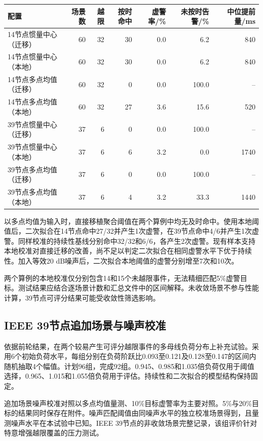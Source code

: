 \documentclass[UTF8,a4paper,11pt]{ctexart}
\begin{document}
\begin{center}
\small\setlength{\tabcolsep}{5pt}
\begin{tabular}{lrrrrrr}
\toprule
配置 & 场景数 & 越限 & 按时命中 & 虚警率/\% & 未按时告警/\% & 中位提前量/ms\\
\midrule
14节点惯量中心（迁移） & 60 & 32 & 30 & 0.0 & 6.2 & 840 \\
14节点惯量中心（本地） & 60 & 32 & 30 & 0.0 & 6.2 & 840 \\
14节点多点均值（迁移） & 60 & 32 & 0 & 0.0 & 100.0 & -- \\
14节点多点均值（本地） & 60 & 32 & 27 & 3.6 & 15.6 & 520 \\
39节点惯量中心（迁移） & 37 & 6 & 0 & 0.0 & 100.0 & -- \\
39节点惯量中心（本地） & 37 & 6 & 6 & 3.2 & 0.0 & 1740 \\
39节点多点均值（迁移） & 37 & 6 & 0 & 0.0 & 100.0 & -- \\
39节点多点均值（本地） & 37 & 6 & 4 & 3.2 & 33.3 & 1440 \\
\bottomrule
\end{tabular}
\end{center}


以多点均值为输入时，直接移植聚合阈值在两个算例中均无及时命中。使用本地阈值后，二次拟合在14节点命中27/32并产生1次虚警，在39节点命中4/6并产生1次虚警。同样校准的持续性基线分别命中32/32和6/6，各产生2次虚警。现有样本支持本地校准对直接迁移的改善，尚不足以判定二次拟合在相同虚警水平下优于持续性。加入等效20 dB噪声后，二次拟合本地阈值的虚警分别增至7次和10次。

两个算例的本地校准仅分别包含14和15个未越限事件，无法精细匹配5\%虚警目标。测试结果应结合逐场景计数和汇总文件中的区间解释。未收敛场景不参与性能计算，39节点可评分结果可能受收敛性筛选影响。

\subsection{IEEE 39节点追加场景与噪声校准}
依据前轮结果，在两个较易产生可评分越限事件的多母线负荷分布上补充试验。采用6个初始负荷水平，每组分别在负荷阶跃比0.093至0.121及0.128至0.147的区间内随机抽取4个幅值。计划96组，完成92组。0.945、0.985和1.035倍负荷仅用于阈值选择，0.965、1.015和1.055倍负荷用于评估。持续性和二次拟合的模型结构保持固定。

追加场景噪声校准对照以多点均值量测、10\%目标虚警率为主要对照。5\%与20\%目标的结果同时保存在附件。噪声匹配阈值由同噪声水平的独立校准场景得到，且量测噪声水平在本试验中已知。IEEE 39节点的非收敛场景完整记录，该组评价针对特意增强越限覆盖的压力测试。
\end{document}
